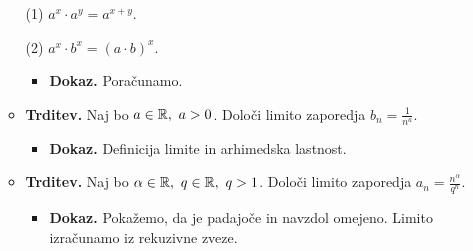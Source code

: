 \begin{enumerate}
\begin{itemize}
        (1) $a^x \cdot a^y = a^{x+y}$.
        
        (2) $a^x \cdot b^x = (a \cdot b)^{x}$.
        \begin{itemize}
            \item \colorbox{green!30}{\textbf{Dokaz.}} Poračunamo.
        \end{itemize} 
        \item \colorbox{blue!30}{\textbf{Trditev.}}   Naj bo $a \in \mathbb{R}, \ a>0$. Določi limito zaporedja $b_n = \frac{1}{n^a}$.
        \begin{itemize}
            \item \colorbox{green!30}{\textbf{Dokaz.}} Definicija limite in arhimedska lastnost.
        \end{itemize} 
        \item \colorbox{blue!30}{\textbf{Trditev.}}  Naj bo $\alpha \in \RR, \ q \in \RR, \ q>1$. Določi limito zaporedja $a_n = \frac{n^\alpha}{q^n}$.
        \begin{itemize}
            \item \colorbox{green!30}{\textbf{Dokaz.}} Pokažemo, da je padajoče in navzdol omejeno. Limito izračunamo iz rekuzivne zveze.
        \end{itemize} 
    \end{itemize}


\end{enumerate}
